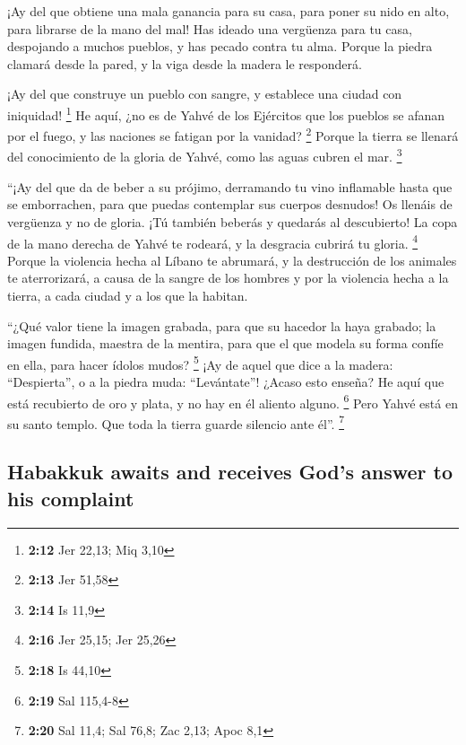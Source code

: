 \begin{paracol}{2}
 ¡Ay del que obtiene una mala ganancia para su casa, para
poner su nido en alto, para librarse de la mano del mal! 
Has ideado una vergüenza para tu casa, despojando a muchos pueblos, y
has pecado contra tu alma.  Porque la piedra clamará
desde la pared, y la viga desde la madera le responderá.

 ¡Ay del que construye un pueblo con sangre, y establece
una ciudad con iniquidad! \footnote{\textbf{2:12} Jer 22,13; Miq 3,10}
 He aquí, ¿no es de Yahvé de los Ejércitos que los
pueblos se afanan por el fuego, y las naciones se fatigan por la
vanidad? \footnote{\textbf{2:13} Jer 51,58}  Porque la
tierra se llenará del conocimiento de la gloria de Yahvé, como las aguas
cubren el mar. \footnote{\textbf{2:14} Is 11,9}

 ``¡Ay del que da de beber a su prójimo, derramando tu
vino inflamable hasta que se emborrachen, para que puedas contemplar sus
cuerpos desnudos!  Os llenáis de vergüenza y no de
gloria. ¡Tú también beberás y quedarás al descubierto! La copa de la
mano derecha de Yahvé te rodeará, y la desgracia cubrirá tu gloria.
\footnote{\textbf{2:16} Jer 25,15; Jer 25,26}  Porque la
violencia hecha al Líbano te abrumará, y la destrucción de los animales
te aterrorizará, a causa de la sangre de los hombres y por la violencia
hecha a la tierra, a cada ciudad y a los que la habitan.

 ``¿Qué valor tiene la imagen grabada, para que su
hacedor la haya grabado; la imagen fundida, maestra de la mentira, para
que el que modela su forma confíe en ella, para hacer ídolos mudos?
\footnote{\textbf{2:18} Is 44,10}  ¡Ay de aquel que dice
a la madera: ``Despierta'', o a la piedra muda: ``Levántate''! ¿Acaso
esto enseña? He aquí que está recubierto de oro y plata, y no hay en él
aliento alguno. \footnote{\textbf{2:19} Sal 115,4-8} 
Pero Yahvé está en su santo templo. Que toda la tierra guarde silencio
ante él''. \footnote{\textbf{2:20} Sal 11,4; Sal 76,8; Zac 2,13; Apoc
  8,1}

\switchcolumn
\begin{otherlanguage}{english}

\hypertarget{habakkuk-awaits-and-receives-gods-answer-to-his-complaint}{%
\subsection{Habakkuk awaits and receives God's answer to his
complaint}\label{habakkuk-awaits-and-receives-gods-answer-to-his-complaint}}


\end{otherlanguage}
\end{paracol}
